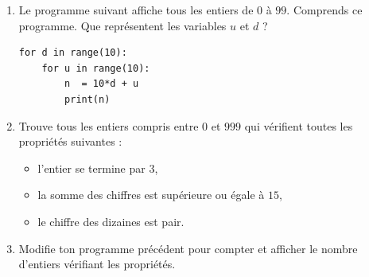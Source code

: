 \documentclass[11pt,class=report,crop=false]{standalone}
\begin{document}
\begin{activite}


\begin{enumerate}
  \item Le programme suivant affiche tous les entiers de $0$ à $99$. Comprends ce programme. Que représentent les variables $u$ et $d$ ?
  
\begin{center}
\begin{minipage}{0.5\textwidth}
\begin{lstlisting}
for d in range(10):
    for u in range(10):
        n  = 10*d + u
        print(n)
\end{lstlisting}
\end{minipage} 
\end{center} 
  
  \item Trouve tous les entiers compris entre $0$ et $999$ qui vérifient toutes les propriétés suivantes :
  \begin{itemize}
    \item l'entier se termine par $3$,
    
    \item la somme des chiffres est supérieure ou égale à $15$,
    
    \item le chiffre des dizaines est pair.
  \end{itemize}
   
  
  \item Modifie ton programme précédent pour compter et afficher le nombre d'entiers vérifiant les propriétés.
  
\end{enumerate}

\end{activite}



\end{document}
